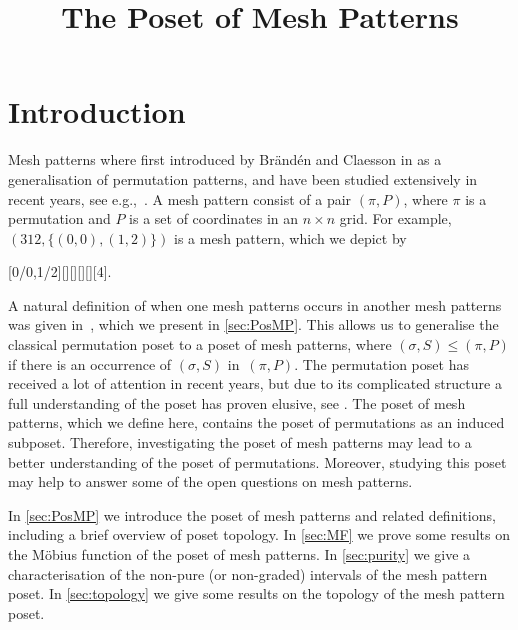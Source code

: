 \documentclass[11pt,a4paper,oneside]{article}
\title{The Poset of Mesh Patterns}
\begin{document}
	\maketitle

\section{Introduction}
Mesh patterns where first introduced by Br\"and\'en and Claesson in \cite{Bra11} as a generalisation
of permutation patterns, and have been studied extensively in recent years, see e.g.,~\cite{CTU15,JKR15}.
A mesh pattern consist of a pair $(\pi,P)$, where $\pi$ is a permutation and $P$ is a set of coordinates
in an $n\times n$ grid. For example, $(312,\{(0,0),(1,2)\})$ is a mesh
pattern, which we depict by
\begin{center}
[0/0,1/2][][][][][4].
\end{center}

A natural definition of when one mesh patterns occurs in another mesh patterns was given in~\cite{TU17},
which we present in \cref{sec:PosMP}.
This allows us to generalise the classical permutation poset to a poset of mesh patterns, where
$(\sigma,S)\le(\pi,P)$ if there is an occurrence of $(\sigma,S)$ in~$(\pi,P)$. The permutation poset
has received a lot of attention in recent years, but due to its
complicated structure a full understanding of the poset has proven elusive,
see \cite{McSt13,Smith15}. The poset of mesh patterns, which we define
here, contains the poset of permutations as an induced subposet. Therefore, investigating
the poset of mesh patterns may lead to a better understanding of the poset of permutations. Moreover, 
studying this poset may help to answer some of the open questions on mesh patterns.

In \cref{sec:PosMP} we introduce the poset of mesh patterns and related definitions,
including a brief overview of poset topology. In \cref{sec:MF} we prove some results
on the M\"obius function of the poset of mesh patterns. In \cref{sec:purity} we give
a characterisation of the non-pure (or non-graded) intervals of the mesh pattern poset.
In \cref{sec:topology} we give some results on the topology of the mesh pattern poset.
\end{document}
